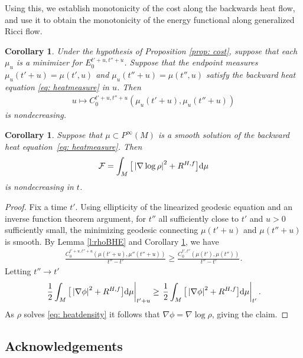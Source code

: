 \documentclass[pdftex]{sigma}
\numberwithin{equation}{section}
\newtheorem{cor}[thm]{Corollary}
\newcommand{\brs}[1]{\left| #1 \right|}
\newcommand{\N}{\nabla}
\begin{document}
Using this, we establish monotonicity of the cost along the backwards heat flow, and use it to obtain the monotonicity of the energy functional along generalized Ricci flow.

\begin{cor}\label{cor: cost} Under the hypothesis of Proposition {\rm \ref{prop: cost}}, suppose that each $\mu_u$ is a minimizer for $E_0^{t'+u,t''+u}$. Suppose that the endpoint measures $\mu_u(t'+u)=\mu(t',u)$ and $\mu_u(t''+u)=\mu(t'',u)$ satisfy the backward heat equation \eqref{eq: heatmeasure} in $u$.
Then
\begin{align*}
 u\mapsto C_0^{t'+u,t''+u}(\mu_u(t'+u),\mu_u(t''+u))
\end{align*}
is nondecreasing.
\end{cor}

\begin{cor} \label{c:Fmonotone} Suppose that $\mu\subset P^\infty(M)$ is a smooth solution of the backward heat equation~\eqref{eq: heatmeasure}. Then
\begin{align*}
 \mathcal F=\int_M\big[\brs{\N\log\rho}^2+R^{H,f}\big] {\rm d}\mu
\end{align*}
is nondecreasing in $t$.
\end{cor}

\begin{proof}
 Fix a time $t'$. Using ellipticity of the linearized geodesic equation and an inverse function theorem argument, for $t''$ all sufficiently close to $t'$ and $u > 0$ sufficiently small, the minimizing geodesic connecting $\mu(t' + u)$ and $\mu(t'' + u)$ is smooth. By Lemma \ref{l:rhoBHE} and Corollary \ref{cor: cost}, we have
 \begin{align*}
 \frac{C_0^{t'+u,t''+u}(\mu(t'+u),\mu''(t''+u))}{t''-t'}\geq \frac{C_0^{t',t''}(\mu(t'),\mu(t''))}{t''-t'}.
 \end{align*}
 Letting $t''\to t'$
 \begin{align*}
 \left. \frac12\int_M\big[\brs{\N\phi}^2+R^{H,f}\big] {\rm d}\mu\right|_{t'+u}\geq
 \left. \frac12\int_M\big[\brs{\N\phi}^2+R^{H,f}\big] {\rm d}\mu\right|_{t'}.
 \end{align*}
 As $\rho$ solves \eqref{eq: heatdensity} it follows that $\N \phi= \N \log \rho$, giving the claim.
\end{proof}

\subsection*{Acknowledgements}
\end{document}
